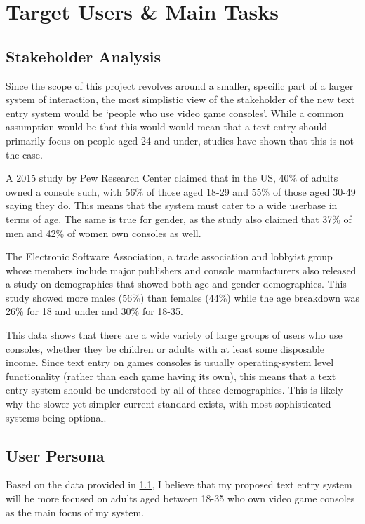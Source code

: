 \documentclass[requirements.tex]{subfiles}
\begin{document}
\section{Target Users \& Main Tasks} %
\label{sec:target_users_main_tasks}

\subsection{Stakeholder Analysis} %
\label{sub:stakeholder_analysis}
Since the scope of this project revolves around a smaller, specific part of a
larger system of interaction, the most simplistic view of the stakeholder of the
new text entry system would be `people who use video game consoles'. While a
common assumption would be that this would would mean that a text entry should
primarily focus on people aged 24 and under, studies have shown that this is
not the case. 

A 2015 study by Pew Research Center \cite{pew} claimed that in the US, 40\% of
adults owned a console such, with 56\% of those aged 18-29 and 55\% of those
aged 30-49 saying they do. This means that the system must cater to a wide
userbase in terms of age. The same is true for gender, as the study also claimed
that 37\% of men and 42\% of women own consoles as well.

The Electronic Software Association, a trade association and lobbyist group
whose members include major publishers and console manufacturers also released a
study \cite{esa} on demographics that showed both age and gender demographics.
This study showed more males (56\%) than females (44\%) while the age breakdown
was 26\% for 18 and under and 30\% for 18-35.

This data shows that there are a wide variety of large groups of users who use
consoles, whether they be children or adults with at least some disposable
income. Since text entry on games consoles is usually operating-system level
functionality (rather than each game having its own), this means that a text
entry system should be understood by all of these demographics. This is likely
why the slower yet simpler current standard exists, with most sophisticated
systems being optional.

\subsection{User Persona} %
\label{sub:user_persona}
Based on the data provided in \ref{sub:stakeholder_analysis}, I believe that my
proposed text entry system will be more focused on adults aged between 18-35 who
own video game consoles as the main focus of my system.
\end{document}
